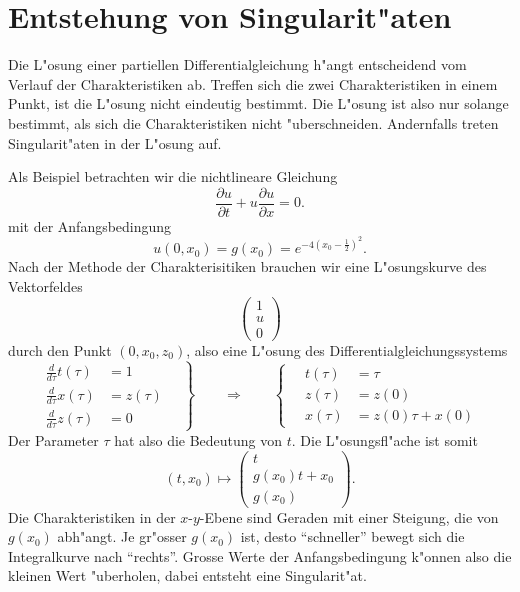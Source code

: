 \section{Entstehung von Singularit"aten}
Die L"osung einer partiellen Differentialgleichung h"angt entscheidend
vom Verlauf der Charakteristiken ab. Treffen sich die zwei Charakteristiken
in einem Punkt, ist die L"osung nicht eindeutig bestimmt. Die L"osung
ist also nur solange bestimmt, als sich die Charakteristiken nicht "uberschneiden.
Andernfalls treten Singularit"aten in der L"osung auf.

Als Beispiel betrachten wir die nichtlineare Gleichung 
\begin{equation}
\frac{\partial u}{\partial t}+u\frac{\partial u}{\partial x}=0.
\label{wellenichtlinear}
\end{equation}
mit der Anfangsbedingung 
$$
u(0,x_0)=g(x_0)=e^{-4(x_0-\frac12)^2}.
$$
Nach der Methode der Charakterisitiken brauchen wir eine L"osungskurve
des Vektorfeldes
$$
\begin{pmatrix}
1\\
u\\
0
\end{pmatrix}
$$
durch den Punkt $(0,x_0, z_0)$, also eine L"osung des Differentialgleichungssystems
$$
\left.
\begin{aligned}
\frac{d}{d\tau} t(\tau)&=1\\
\frac{d}{d\tau} x(\tau)&=z(\tau)\\
\frac{d}{d\tau} z(\tau)&=0
\end{aligned}
\quad
\right\}
\qquad
\Rightarrow
\qquad
\left\{
\quad
\begin{aligned}
t(\tau)&=\tau\\
z(\tau)&=z(0)\\
x(\tau)&=z(0)\tau +x(0)
\end{aligned}
\right.
$$
Der Parameter $\tau$ hat also die Bedeutung von $t$.
Die L"osungsfl"ache ist somit
$$
(t,x_0)\mapsto
\begin{pmatrix}
t\\
g(x_0)t+x_0\\
g(x_0)
\end{pmatrix}.
$$
Die Charakteristiken in der $x$-$y$-Ebene sind Geraden mit einer
Steigung, die von $g(x_0)$ abh"angt. Je gr"osser $g(x_0)$ ist, desto
``schneller'' bewegt sich die Integralkurve nach ``rechts''. Grosse
Werte der Anfangsbedingung k"onnen also die kleinen Wert "uberholen,
dabei entsteht eine Singularit"at.

